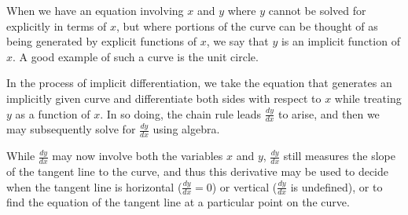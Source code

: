 \begin{summary}
\item When we have an equation involving $x$ and $y$ where $y$ cannot be solved for explicitly in terms of $x$, but where portions of the curve can be thought of as being generated by explicit functions of $x$, we say that $y$ is an implicit function of $x$.  A good example of such a curve is the unit circle.
\item In the process of implicit differentiation, we take the equation that generates an implicitly given curve and differentiate both sides with respect to $x$ while treating $y$ as a function of $x$.  In so doing, the chain rule leads $\frac{dy}{dx}$ to arise, and then we may subsequently solve for $\frac{dy}{dx}$ using algebra. 
\item While $\frac{dy}{dx}$ may now involve both the variables $x$ and $y$, $\frac{dy}{dx}$ still measures the slope of the tangent line to the curve, and thus this derivative may be used to decide when the tangent line is horizontal ($\frac{dy}{dx} = 0$) or vertical ($\frac{dy}{dx}$ is undefined), or to find the equation of the tangent line at a particular point on the curve.
\end{summary}

\nin \hrulefill

 
